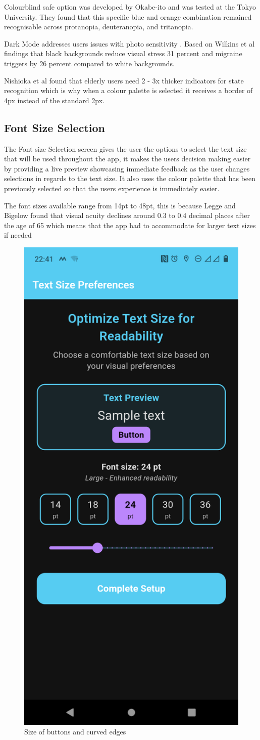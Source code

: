\documentclass[]{project_final}
\begin{document}
Colourblind safe option was developed by Okabe-ito and was tested at the Tokyo University. They found that this specific blue and orange combination remained recognisable across protanopia, deuteranopia, and tritanopia.


Dark Mode addresses users issues with photo sensitivity . Based on Wilkins et al findings that black backgrounds reduce visual stress 31 percent and migraine triggers by 26 percent compared to white backgrounds.


Nishioka et al found that elderly users need 2 - 3x thicker indicators for state recognition which is why when a colour palette is selected it receives a border of 4px instead of the standard 2px.


\subsection{Font Size Selection}
The Font size Selection screen gives the user the options to select the text size that will be used throughout the app, it makes the users decision making easier by providing a live preview showcasing immediate feedback as the user changes selections in regards to the text size. It also uses the colour palette that has been previously selected so that the users experience is immediately easier.

The font sizes available range from 14pt to 48pt, this is because Legge and Bigelow found that visual acuity declines around 0.3 to 0.4 decimal places after the age of 65 which means that the app had to accommodate for larger text sizes if needed

\begin{figure}[ht!]
    \centering
    \includegraphics[height=0.3\textwidth]{M Font Size.png}
    \caption{Size of buttons and curved edges}
    \label{fig:1}
\end{figure}
\end{document}
